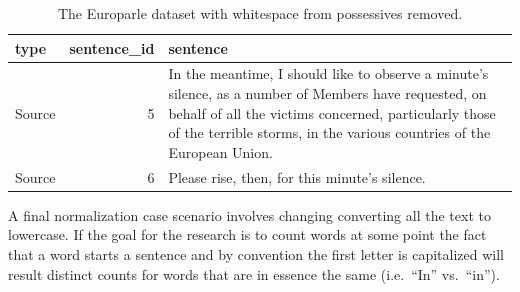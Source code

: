 \documentclass[
]{article}
\begin{document}
\begin{table}

\caption{\label{tab:normalize-whitespace-remove-europarle}The Europarle dataset with whitespace from possessives removed.}
\centering
\begin{tabular}[t]{lrl}
\toprule
type & sentence\_id & sentence\\
\midrule
Source & 5 & In the meantime, I should like to observe a minute's silence, as a number of Members have requested, on behalf of all the victims concerned, particularly those of the terrible storms, in the various countries of the European Union.\\
Source & 6 & Please rise, then, for this minute's silence.\\
\bottomrule
\end{tabular}
\end{table}

A final normalization case scenario involves changing converting all the text to lowercase. If the goal for the research is to count words at some point the fact that a word starts a sentence and by convention the first letter is capitalized will result distinct counts for words that are in essence the same (i.e.~``In'' vs.~``in'').
\end{document}
